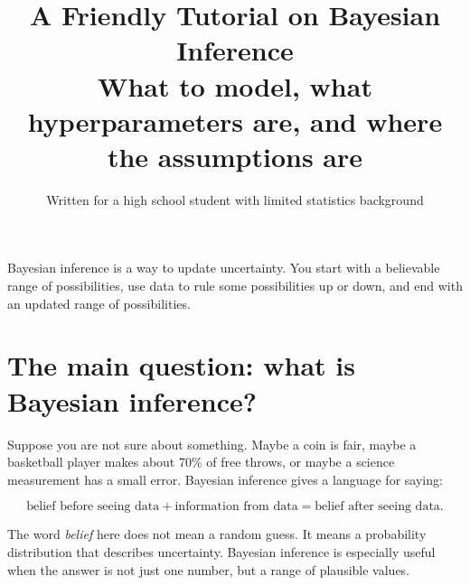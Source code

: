 \documentclass[11pt]{article}
\title{\vspace{-1cm}\Huge A Friendly Tutorial on Bayesian Inference\\[0.2cm]
\Large What to model, what hyperparameters are, and where the assumptions are}
\author{Written for a high school student with limited statistics background}
\date{}
\begin{document}
\maketitle
\thispagestyle{empty}

\begin{center}
\end{center}

\begin{bigidea}
Bayesian inference is a way to update uncertainty. You start with a believable range of possibilities, use data to rule some possibilities up or down, and end with an updated range of possibilities.
\end{bigidea}

\vfill
\tableofcontents
\newpage
{}

\section{The main question: what is Bayesian inference?}

Suppose you are not sure about something. Maybe a coin is fair, maybe a basketball player makes about 70\% of free throws, or maybe a science measurement has a small error. Bayesian inference gives a language for saying:

\begin{center}
\Large
\[\text{belief before seeing data} + \text{information from data} = \text{belief after seeing data}.\]
\end{center}

The word \emph{belief} here does not mean a random guess. It means a probability distribution that describes uncertainty. Bayesian inference is especially useful when the answer is not just one number, but a range of plausible values.
\end{document}
